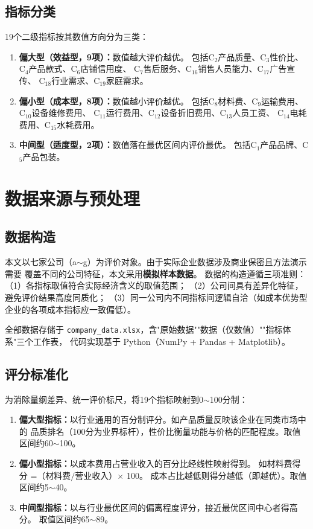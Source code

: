 \documentclass[a4paper,12pt]{ctexart}
\begin{document}
\subsection{指标分类}

19个二级指标按其数值方向分为三类：

\begin{enumerate}[label=(\arabic*),itemsep=2pt]
    \item \textbf{偏大型（效益型，9项）：}数值越大评价越优。
          包括C$_2$产品质量、C$_3$性价比、C$_4$产品款式、C$_6$店铺信用度、
          C$_7$售后服务、C$_{16}$销售人员能力、C$_{17}$广告宣传、
          C$_{18}$行业需求、C$_{19}$家庭需求。
    \item \textbf{偏小型（成本型，8项）：}数值越小评价越优。
          包括C$_8$材料费、C$_9$运输费用、C$_{10}$设备维修费用、
          C$_{11}$运行费用、C$_{12}$设备折旧费用、C$_{13}$人员工资、
          C$_{14}$电耗费用、C$_{15}$水耗费用。
    \item \textbf{中间型（适度型，2项）：}数值落在最优区间内评价最优。
          包括C$_1$产品品牌、C$_5$产品包装。
\end{enumerate}

\section{数据来源与预处理}

\subsection{数据构造}

本文以七家公司（a$\sim$g）为评价对象。由于实际企业数据涉及商业保密且方法演示需要
覆盖不同的公司特征，本文采用\textbf{模拟样本数据}。
数据的构造遵循三项准则：
（1）各指标取值符合实际经济含义的取值范围；
（2）公司间具有差异化特征，避免评价结果高度同质化；
（3）同一公司内不同指标间逻辑自洽（如成本优势型企业的各项成本指标应一致偏低）。

全部数据存储于 \texttt{company\_data.xlsx}，含"原始数据""数据（仅数值）""指标体系"三个工作表，
代码实现基于 Python（NumPy + Pandas + Matplotlib）。

\subsection{评分标准化}

为消除量纲差异、统一评价标尺，将19个指标映射到0$\sim$100分制：

\begin{enumerate}[label=(\arabic*),itemsep=2pt]
    \item \textbf{偏大型指标：}以行业通用的百分制评分。如产品质量反映该企业在同类市场中的
          品质排名（100分为业界标杆），性价比衡量功能与价格的匹配程度。取值区间约60$\sim$100。
    \item \textbf{偏小型指标：}以成本费用占营业收入的百分比经线性映射得到。
          如材料费得分 =（材料费$/$营业收入）$\times$ 100。
          成本占比越低则得分越低（即越优）。取值区间约5$\sim$40。
    \item \textbf{中间型指标：}以与行业最优区间的偏离程度评分，接近最优区间中心者得高分。
          取值区间约65$\sim$89。
\end{enumerate}
\end{document}
